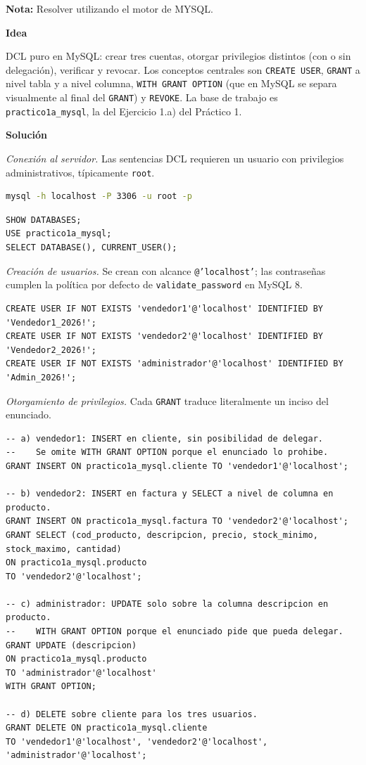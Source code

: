 \documentclass[11pt,a4paper]{article}
\newcommand{\itemcabecera}[1]{\noindent\textbf{#1}\par\medskip}
\newcommand{\bloqueIdea}{\itemcabecera{Idea}}
\newcommand{\bloqueSolucion}{\itemcabecera{Soluci\'on}}
\begin{document}
\textbf{Nota:} Resolver utilizando el motor de MYSQL.

\bloqueIdea

DCL puro en MySQL: crear tres cuentas, otorgar privilegios distintos (con o sin delegación), verificar y revocar. Los conceptos centrales son \texttt{CREATE USER}, \texttt{GRANT} a nivel tabla y a nivel columna, \texttt{WITH GRANT OPTION} (que en MySQL se separa visualmente al final del \texttt{GRANT}) y \texttt{REVOKE}. La base de trabajo es \texttt{practico1a\_mysql}, la del Ejercicio 1.a) del Práctico 1.

\bloqueSolucion

\textit{Conexión al servidor.} Las sentencias DCL requieren un usuario con privilegios administrativos, típicamente \texttt{root}.

\begin{lstlisting}[language=bash]
mysql -h localhost -P 3306 -u root -p
\end{lstlisting}

\begin{lstlisting}
SHOW DATABASES;
USE practico1a_mysql;
SELECT DATABASE(), CURRENT_USER();
\end{lstlisting}

\textit{Creación de usuarios.} Se crean con alcance \texttt{@'localhost'}; las contraseñas cumplen la política por defecto de \texttt{validate\_password} en MySQL 8.

\begin{lstlisting}
CREATE USER IF NOT EXISTS 'vendedor1'@'localhost' IDENTIFIED BY 'Vendedor1_2026!';
CREATE USER IF NOT EXISTS 'vendedor2'@'localhost' IDENTIFIED BY 'Vendedor2_2026!';
CREATE USER IF NOT EXISTS 'administrador'@'localhost' IDENTIFIED BY 'Admin_2026!';
\end{lstlisting}

\textit{Otorgamiento de privilegios.} Cada \texttt{GRANT} traduce literalmente un inciso del enunciado.

\begin{lstlisting}
-- a) vendedor1: INSERT en cliente, sin posibilidad de delegar.
--    Se omite WITH GRANT OPTION porque el enunciado lo prohibe.
GRANT INSERT ON practico1a_mysql.cliente TO 'vendedor1'@'localhost';

-- b) vendedor2: INSERT en factura y SELECT a nivel de columna en producto.
GRANT INSERT ON practico1a_mysql.factura TO 'vendedor2'@'localhost';
GRANT SELECT (cod_producto, descripcion, precio, stock_minimo, stock_maximo, cantidad)
ON practico1a_mysql.producto
TO 'vendedor2'@'localhost';

-- c) administrador: UPDATE solo sobre la columna descripcion en producto.
--    WITH GRANT OPTION porque el enunciado pide que pueda delegar.
GRANT UPDATE (descripcion)
ON practico1a_mysql.producto
TO 'administrador'@'localhost'
WITH GRANT OPTION;

-- d) DELETE sobre cliente para los tres usuarios.
GRANT DELETE ON practico1a_mysql.cliente
TO 'vendedor1'@'localhost', 'vendedor2'@'localhost', 'administrador'@'localhost';
\end{lstlisting}
\end{document}
